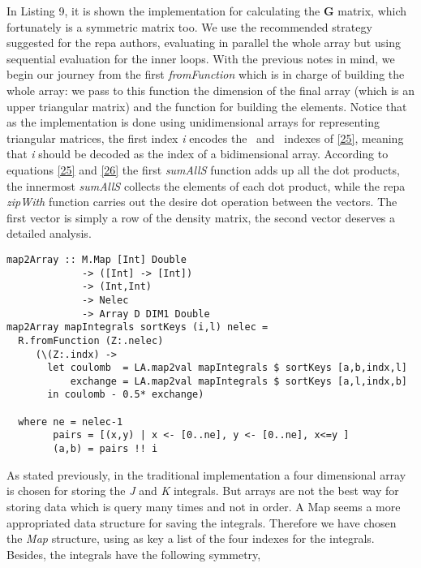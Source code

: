 \documentclass{tmr}
\begin{document}
In Listing 9, it is shown the implementation for calculating the \textbf{G} matrix, which
fortunately is a symmetric matrix too.  We use the recommended strategy suggested 
for the repa authors, evaluating in parallel the whole array but using sequential
evaluation for the inner loops. With the previous notes in mind, we begin our journey from
the first \textit{fromFunction} which is in charge of building the whole array: we pass to
this function the dimension of the final array (which is an upper triangular matrix) and 
the function for building the elements. Notice that 
as the implementation is done using unidimensional arrays for representing triangular
matrices, the first index \textit{i} encodes the \textalpha\ and \textbeta\ indexes of
\eqref{25}, meaning that \textit{i} should be decoded as the index of a bidimensional 
array. According to equations \eqref{25} and \eqref{26} the first
\textit{sumAllS} function adds up all the dot products, the innermost \textit{sumAllS}
collects the elements of each dot product, while the repa \textit{zipWith} function carries out
the desire dot operation between the vectors. The first vector is simply a row of the
density matrix, the second vector deserves a detailed analysis. 

\begin{lstlisting}[float,captionpos=b,belowcaptionskip=4pt, caption= The Map to Array Function]
map2Array :: M.Map [Int] Double 
             -> ([Int] -> [Int])
             -> (Int,Int) 
             -> Nelec 
             -> Array D DIM1 Double
map2Array mapIntegrals sortKeys (i,l) nelec = 
  R.fromFunction (Z:.nelec)
     (\(Z:.indx) ->
       let coulomb  = LA.map2val mapIntegrals $ sortKeys [a,b,indx,l]
           exchange = LA.map2val mapIntegrals $ sortKeys [a,l,indx,b]
       in coulomb - 0.5* exchange)
                                                            
  where ne = nelec-1
        pairs = [(x,y) | x <- [0..ne], y <- [0..ne], x<=y ]
        (a,b) = pairs !! i
\end{lstlisting}
 
As stated previously, in the traditional implementation a four dimensional array
is chosen for storing the \textit{J} and \textit{K} integrals. But arrays are not
the best way for storing data which is query many times and not in order. A Map 
seems a more appropriated data structure for saving the integrals. Therefore 
we have chosen the \textit{Map} structure, using as key a list of the four
indexes for the integrals. Besides, the integrals have the following
symmetry, 
\end{document}
